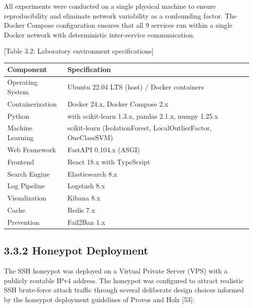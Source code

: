 \documentclass[
  a4paper]{report}
\newcounter{none} %
\begin{document}
All experiments were conducted on a single physical machine to ensure
reproducibility and eliminate network variability as a confounding
factor. The Docker Compose configuration ensures that all 9 services run
within a single Docker network with deterministic inter-service
communication.

{[}Table 3.2: Laboratory environment specifications{]}

{\def\LTcaptype{none} %
\begin{longtable}[]{@{}
  >{\raggedright\arraybackslash}p{}
  >{\raggedright\arraybackslash}p{}@{}}
\toprule\noalign{}
\begin{minipage}[b]{\linewidth}\raggedright
Component
\end{minipage} & \begin{minipage}[b]{\linewidth}\raggedright
Specification
\end{minipage} \\
\midrule\noalign{}
\endhead
\bottomrule\noalign{}
\endlastfoot
Operating System & Ubuntu 22.04 LTS (host) / Docker containers \\
Containerization & Docker 24.x, Docker Compose 2.x \\
Python & 3.10 with scikit-learn 1.3.x, pandas 2.1.x, numpy 1.25.x \\
Machine Learning & scikit-learn (IsolationForest, LocalOutlierFactor,
OneClassSVM) \\
Web Framework & FastAPI 0.104.x (ASGI) \\
Frontend & React 18.x with TypeScript \\
Search Engine & Elasticsearch 8.x \\
Log Pipeline & Logstash 8.x \\
Visualization & Kibana 8.x \\
Cache & Redis 7.x \\
Prevention & Fail2Ban 1.x \\
\end{longtable}
}

\subsection{3.3.2 Honeypot Deployment}\label{honeypot-deployment}

The SSH honeypot was deployed on a Virtual Private Server (VPS) with a
publicly routable IPv4 address. The honeypot was configured to attract
realistic SSH brute-force attack traffic through several deliberate
design choices informed by the honeypot deployment guidelines of Provos
and Holz {[}53{]}:
\end{document}
